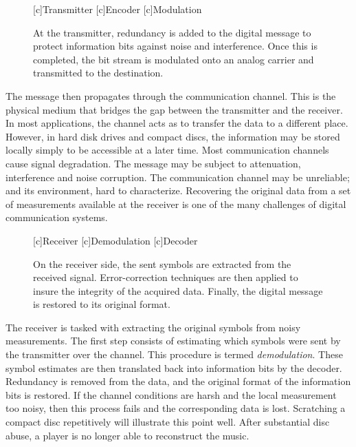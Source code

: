 \begin{figure}[htbp]
\begin{center}
\begin{psfrags}
[c]{Transmitter}
[c]{Encoder}
[c]{Modulation}
\end{psfrags}
\end{center}
\caption{At the transmitter, redundancy is added to the digital message to protect information bits against noise and interference.
Once this is completed, the bit stream is modulated onto an analog carrier and transmitted to the destination.}
\label{figure:BlockTransmitter}
\end{figure}

The message then propagates through the communication channel.
This is the physical medium that bridges the gap between the transmitter and the receiver.
In most applications, the channel acts as to transfer the data to a different place.
However, in hard disk drives and compact discs, the information may be stored locally simply to be accessible at a later time.
Most communication channels cause signal degradation.
The message  may be subject to attenuation, interference and noise corruption.
The communication channel may be unreliable; and its environment, hard to characterize.
Recovering the original data from a set of measurements available at the receiver is one of the many challenges of digital communication systems.

\begin{figure}[htbp]
\begin{center}
\begin{psfrags}
[c]{Receiver}
[c]{Demodulation}
[c]{Decoder}
\end{psfrags}
\end{center}
\caption{On the receiver side, the sent symbols are extracted from the received signal.
Error-correction techniques are then applied to insure the integrity of the acquired data.
Finally, the digital message is restored to its original format.}
\label{figure:BlockReceiver}
\end{figure}

The receiver is tasked with extracting the original symbols from noisy measurements.
The first step consists of estimating which symbols were sent by the transmitter over the channel.
This procedure is termed \emph{demodulation}.
These symbol estimates are then translated back into information bits by the decoder.
Redundancy is removed from the data, and the original format of the information bits is restored.
If the channel conditions are harsh and the local measurement too noisy, then this process fails and the corresponding data is lost.
Scratching a compact disc repetitively will illustrate this point well.
After substantial disc abuse, a player is no longer able to reconstruct the music.


